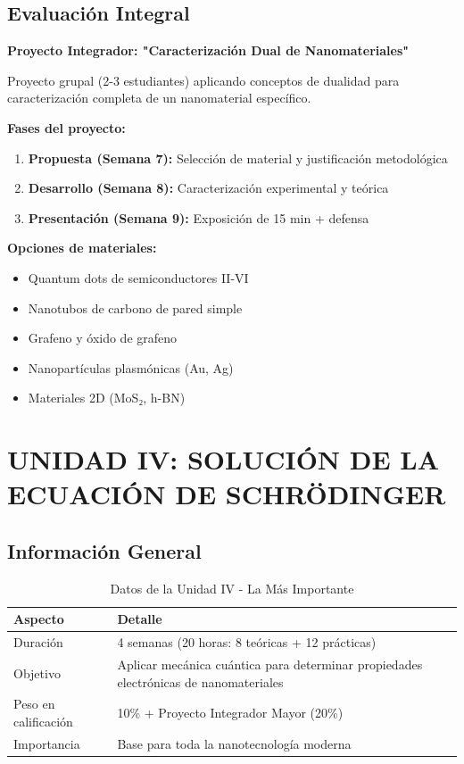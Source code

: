 \section{Evaluación Integral}

\begin{evaluacionbox}
	\textbf{Proyecto Integrador: "Caracterización Dual de Nanomateriales"}
	
	Proyecto grupal (2-3 estudiantes) aplicando conceptos de dualidad para caracterización completa de un nanomaterial específico.
	
	\textbf{Fases del proyecto:}
	\begin{enumerate}
		\item \textbf{Propuesta (Semana 7):} Selección de material y justificación metodológica
		\item \textbf{Desarrollo (Semana 8):} Caracterización experimental y teórica
		\item \textbf{Presentación (Semana 9):} Exposición de 15 min + defensa
	\end{enumerate}
	
	\textbf{Opciones de materiales:}
	\begin{itemize}
		\item Quantum dots de semiconductores II-VI
		\item Nanotubos de carbono de pared simple
		\item Grafeno y óxido de grafeno
		\item Nanopartículas plasmónicas (Au, Ag)
		\item Materiales 2D (MoS₂, h-BN)
	\end{itemize}
\end{evaluacionbox}

\chapter{UNIDAD IV: SOLUCIÓN DE LA ECUACIÓN DE SCHRÖDINGER}

\section{Información General}

\begin{table}[h]
	\centering
	\caption{Datos de la Unidad IV - La Más Importante}
	\begin{tabular}{|L{4cm}|L{8cm}|}
		\hline
		\textbf{Aspecto} & \textbf{Detalle} \\
		\hline
		Duración & 4 semanas (20 horas: 8 teóricas + 12 prácticas) \\
		\hline
		Objetivo & Aplicar mecánica cuántica para determinar propiedades electrónicas de nanomateriales \\
		\hline
		Peso en calificación & 10\% + Proyecto Integrador Mayor (20\%) \\
		\hline
		Importancia & Base para toda la nanotecnología moderna \\
		\hline
	\end{tabular}
\end{table}

